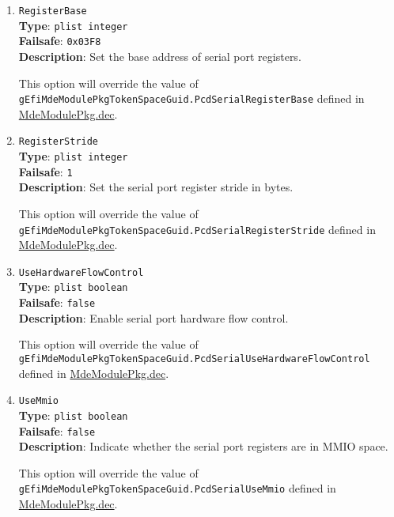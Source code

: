 \documentclass[]{article}
\begin{document}
\begin{enumerate}
\item
  \texttt{RegisterBase}\\
  \textbf{Type}: \texttt{plist\ integer}\\
  \textbf{Failsafe}: \texttt{0x03F8}\\
  \textbf{Description}: Set the base address of serial port registers.

  This option will override the value of \texttt{gEfiMdeModulePkgTokenSpaceGuid.PcdSerialRegisterBase}
  defined in \href{https://github.com/acidanthera/audk/blob/master/MdeModulePkg/MdeModulePkg.dec}{MdeModulePkg.dec}.

\item
  \texttt{RegisterStride}\\
  \textbf{Type}: \texttt{plist\ integer}\\
  \textbf{Failsafe}: \texttt{1}\\
  \textbf{Description}: Set the serial port register stride in bytes.

  This option will override the value of \texttt{gEfiMdeModulePkgTokenSpaceGuid.PcdSerialRegisterStride}
  defined in \href{https://github.com/acidanthera/audk/blob/master/MdeModulePkg/MdeModulePkg.dec}{MdeModulePkg.dec}.

\item
  \texttt{UseHardwareFlowControl}\\
  \textbf{Type}: \texttt{plist\ boolean}\\
  \textbf{Failsafe}: \texttt{false}\\
  \textbf{Description}: Enable serial port hardware flow control.

  This option will override the value of \texttt{gEfiMdeModulePkgTokenSpaceGuid.PcdSerialUseHardwareFlowControl}
  defined in \href{https://github.com/acidanthera/audk/blob/master/MdeModulePkg/MdeModulePkg.dec}{MdeModulePkg.dec}.

\item
  \texttt{UseMmio}\\
  \textbf{Type}: \texttt{plist\ boolean}\\
  \textbf{Failsafe}: \texttt{false}\\
  \textbf{Description}: Indicate whether the serial port registers are in MMIO space.

  This option will override the value of \texttt{gEfiMdeModulePkgTokenSpaceGuid.PcdSerialUseMmio}
  defined in \href{https://github.com/acidanthera/audk/blob/master/MdeModulePkg/MdeModulePkg.dec}{MdeModulePkg.dec}.

\end{enumerate}
\end{document}
